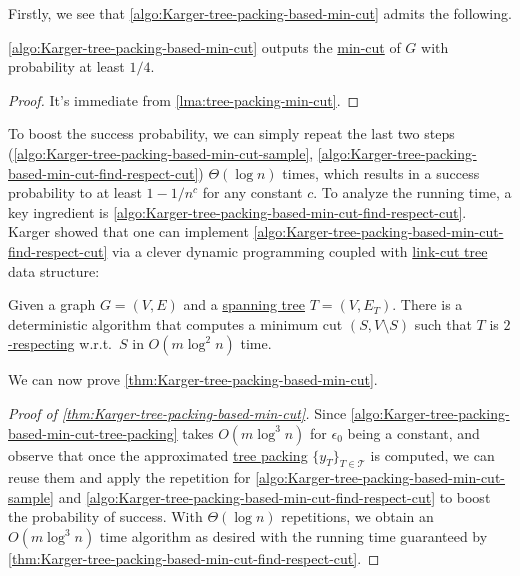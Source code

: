 Firstly, we see that \autoref{algo:Karger-tree-packing-based-min-cut} admits the following.

\begin{lemma}
	\autoref{algo:Karger-tree-packing-based-min-cut} outputs the \hyperref[prb:global-min-cut]{min-cut} of \(G\) with probability at least \(1 / 4\).
\end{lemma}
\begin{proof}
	It's immediate from \autoref{lma:tree-packing-min-cut}.
\end{proof}

To boost the success probability, we can simply repeat the last two steps (\autoref{algo:Karger-tree-packing-based-min-cut-sample}, \autoref{algo:Karger-tree-packing-based-min-cut-find-respect-cut}) \(\Theta (\log n)\) times, which results in a success probability to at least \(1 - 1 / n^c\) for any constant \(c\). To analyze the running time, a key ingredient is \autoref{algo:Karger-tree-packing-based-min-cut-find-respect-cut}. Karger showed that one can implement \autoref{algo:Karger-tree-packing-based-min-cut-find-respect-cut} via a clever dynamic programming coupled with \hyperref[def:link-cut-tree]{link-cut tree} data structure:

\begin{theorem}\label{thm:Karger-tree-packing-based-min-cut-find-respect-cut}
	Given a graph \(G = (V, E)\) and a \hyperref[def:spanning-tree]{spanning tree} \(T = (V, E_T)\). There is a deterministic algorithm that computes a minimum cut \((S, V \setminus S)\) such that \(T\) is \hyperref[def:respect]{\(2\)-respecting} w.r.t.\ \(S\) in \(O(m \log ^2 n)\) time.
\end{theorem}

We can now prove \autoref{thm:Karger-tree-packing-based-min-cut}.

\begin{proof}[Proof of \autoref{thm:Karger-tree-packing-based-min-cut}]
	Since \autoref{algo:Karger-tree-packing-based-min-cut-tree-packing} takes \(O(m \log ^3 n)\) for \(\epsilon _0\) being a constant, and observe that once the approximated \hyperref[prb:tree-packing]{tree packing} \(\{ y_T \} _{T \in \mathcal{T} }\) is computed, we can reuse them and apply the repetition for \autoref{algo:Karger-tree-packing-based-min-cut-sample} and \autoref{algo:Karger-tree-packing-based-min-cut-find-respect-cut} to boost the probability of success. With \(\Theta (\log n)\) repetitions, we obtain an \(O(m \log ^3 n)\) time algorithm as desired with the running time guaranteed by \autoref{thm:Karger-tree-packing-based-min-cut-find-respect-cut}.
\end{proof}

